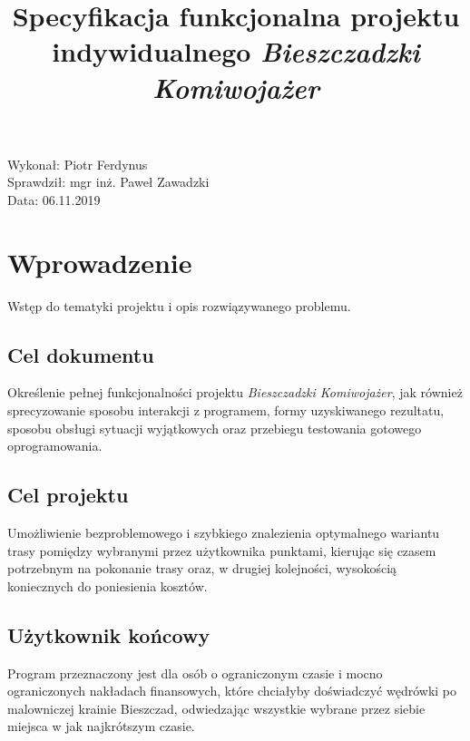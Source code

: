 \documentclass{article}
\title{Specyfikacja funkcjonalna projektu indywidualnego \textit{Bieszczadzki Komiwojażer}}
\begin{document}
\begin{titlepage}
\makeatletter
\noindent
\vspace{25pt}
\begin{center}
\LARGE \textsc{\@title}
\end{center}
\makeatother
\vspace{300pt}
\begin{flushright}
\noindent Wykonał: Piotr Ferdynus\\
Sprawdził: mgr inż. Paweł Zawadzki\\
Data: 06.11.2019\\
\end{flushright}


\thispagestyle{empty}
\end{titlepage}

\lhead{}
\cfoot{\thepage \hspace{1pt} / \pageref{LastPage}}
\setcounter{page}{2}

\section{Wprowadzenie}
Wstęp do tematyki projektu i opis rozwiązywanego problemu.
\subsection{Cel dokumentu}
Określenie pełnej funkcjonalności projektu \textit{Bieszczadzki Komiwojażer}, jak również sprecyzowanie sposobu interakcji z programem, formy uzyskiwanego rezultatu, sposobu obsługi sytuacji wyjątkowych oraz przebiegu testowania gotowego oprogramowania.

\subsection{Cel projektu}
Umożliwienie bezproblemowego i szybkiego znalezienia optymalnego wariantu trasy pomiędzy wybranymi przez użytkownika punktami, kierując się czasem potrzebnym na pokonanie trasy oraz, w drugiej kolejności, wysokością koniecznych do poniesienia kosztów.

\subsection{Użytkownik końcowy}
Program przeznaczony jest dla osób o ograniczonym czasie i mocno ograniczonych nakładach finansowych, które chciałyby doświadczyć wędrówki po malowniczej krainie Bieszczad, odwiedzając wszystkie wybrane przez siebie miejsca w jak najkrótszym czasie.
\end{document}
